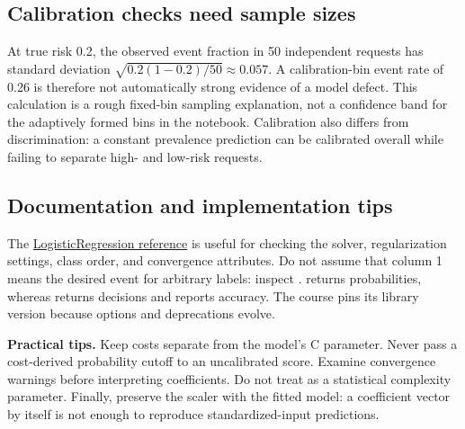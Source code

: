 \subsection*{Calibration checks need sample sizes}
At true risk 0.2, the observed event fraction in 50 independent requests has standard deviation
$\sqrt{0.2(1-0.2)/50}\approx0.057$. A calibration-bin event rate of 0.26 is therefore not automatically
strong evidence of a model defect. This calculation is a rough fixed-bin sampling explanation, not a confidence
band for the adaptively formed bins in the notebook. Calibration also differs from discrimination:
a constant prevalence prediction can be calibrated overall while failing to separate high- and low-risk requests.

\newpage
\subsection*{Documentation and implementation tips}
The \href{https://scikit-learn.org/1.8/modules/generated/sklearn.linear_model.LogisticRegression.html}{LogisticRegression reference}
is useful for checking the solver, regularization settings, class order, and convergence attributes.
Do not assume that column 1 means the desired event for arbitrary labels: inspect .
 returns probabilities, whereas  returns decisions and  reports accuracy.
The course pins its library version because options and deprecations evolve.

\textbf{Practical tips.} Keep costs separate from the model's C parameter. Never pass a cost-derived probability
cutoff to an uncalibrated score. Examine convergence warnings before interpreting coefficients. Do not treat
 as a statistical complexity parameter. Finally, preserve the scaler with the fitted model:
a coefficient vector by itself is not enough to reproduce standardized-input predictions.


